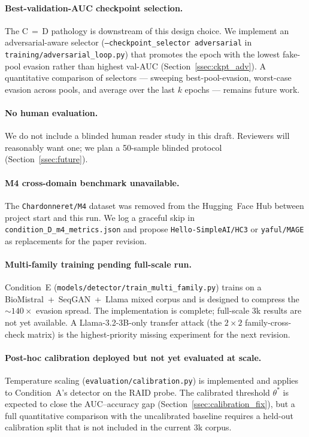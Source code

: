 \paragraph{Best-validation-AUC checkpoint selection.}
The C\,$=$\,D pathology is downstream of this design choice. We implement
an adversarial-aware selector (\texttt{--checkpoint\_selector adversarial}
in \texttt{training/adversarial\_loop.py}) that promotes the epoch with the
lowest fake-pool evasion rather than highest val-AUC
(Section~\ref{ssec:ckpt_adv}). A quantitative comparison of
selectors — sweeping best-pool-evasion, worst-case evasion across pools, and
average over the last $k$ epochs — remains future work.

\paragraph{No human evaluation.}
We do not include a blinded human reader study in this draft. Reviewers
will reasonably want one; we plan a 50-sample blinded protocol
(Section~\ref{ssec:future}).

\paragraph{M4 cross-domain benchmark unavailable.}
The \texttt{Chardonneret/M4} dataset \cite{wang2024m4} was removed from
the Hugging~Face Hub between project start and this run. We log a
graceful skip in \texttt{condition\_D\_m4\_metrics.json} and propose
\texttt{Hello-SimpleAI/HC3} \cite{guo2023hc3} or
\texttt{yaful/MAGE} \cite{li2024mage} as replacements for the paper
revision.

\paragraph{Multi-family training pending full-scale run.}
Condition~E (\texttt{models/detector/train\_multi\_family.py}) trains
on a BioMistral~+~SeqGAN~+~Llama mixed corpus and is designed to
compress the \(\sim\!140\times\) evasion spread. The implementation is
complete; full-scale \(3\)k results are not yet available. A
Llama-3.2-3B-only transfer attack (the $2\times 2$ family-cross-check matrix)
is the highest-priority missing experiment for the next revision.

\paragraph{Post-hoc calibration deployed but not yet evaluated at scale.}
Temperature scaling (\texttt{evaluation/calibration.py}) is implemented and
applies to Condition~A's detector on the RAID probe. The calibrated threshold
\(\theta^*\) is expected to close the AUC--accuracy gap
(Section~\ref{ssec:calibration_fix}), but a full quantitative comparison
with the uncalibrated baseline requires a held-out calibration split that
is not included in the current \(3\)k corpus.

